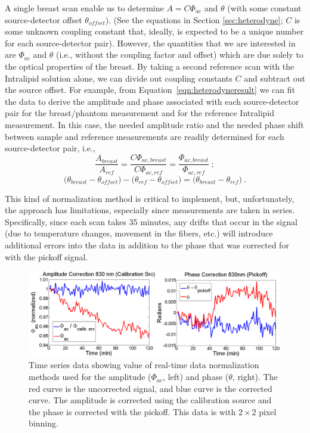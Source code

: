 A single breast scan enable us to determine $A=C\Phi_{ac}$ and $\theta$ (with some constant source-detector offset $\theta_{offset}$). (See the equations in Section \ref{sec:heterodyne}; $C$ is some unknown coupling constant that, ideally, is expected to be a unique number for each source-detector pair). However, the quantities that we are interested in are $\Phi_{ac}$ and $\theta$ (i.e., without the coupling factor and offset) which are due solely to the optical properties of the breast. By taking a second reference scan with the Intralipid solution alone, we can divide out coupling constants $C$ and subtract out the source offset. For example, from Equation~\ref{eqn:heterodyneresult} we can fit the data to derive the amplitude and phase associated with each source-detector pair for the breast/phantom measurement and for the reference Intralipid measurement. In this case, the needed amplitude ratio and the needed phase shift between sample and reference measurements are readily determined for each source-detector pair, i.e.,
%
\begin{equation}
\frac{A_{breast}}{A_{ref}} = \frac{C\Phi_{ac,breast}}{C\Phi_{ac,ref}} = \frac{\Phi_{ac,breast}}{\Phi_{ac,ref}} \ ;
\end{equation}
\begin{equation}
\Big(\theta_{breast} - \theta_{offset}\Big) -\Big(\theta_{ref} - \theta_{offset}\Big) = \Big(\theta_{breast} - \theta_{ref}\Big) \ .
\end{equation}

This kind of normalization method is critical to implement, but, unfortunately, the approach has limitations, especially since measurements are taken in series. Specifically, since each scan takes 35 minutes, any drifts that occur in the signal (due to temperature changes, movement in the fibers, etc.) will introduce additional errors into the data in addition to the phase that was corrected for with the pickoff signal.

\begin{figure}[t]
\centering
\includegraphics[width=14.5cm]{./figures/4_Gen3/datacorrect.png}
\caption[Time series data showing value of real-time data normalization methods used for the amplitude ($\Phi_{ac}$) and phase ($\theta$)]{Time series data showing value of real-time data normalization methods used for the amplitude ($\Phi_{ac}$, left) and phase ($\theta$, right). The red curve is the uncorrected signal, and blue curve is the corrected curve. The amplitude is corrected using the calibration source and the phase is corrected with the pickoff. This data is with $2\times 2$ pixel binning.}
\label{fig:datacorrect}
\end{figure}

